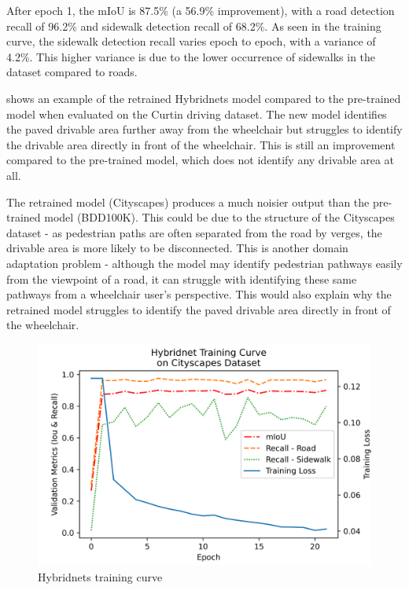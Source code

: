 After epoch 1, the mIoU is 87.5\% (a 56.9\% improvement), with a
road detection recall of 96.2\% and sidewalk detection recall of
68.2\%. As seen in the training curve, the sidewalk detection recall
varies epoch to epoch, with a variance of 4.2\%. This higher variance is
due to the lower occurrence of sidewalks in the dataset compared to roads.

 shows an example of the retrained Hybridnets model
compared to the pre-trained model when evaluated on the Curtin driving dataset.
The new model identifies the paved drivable area further away from
the wheelchair but struggles to identify the drivable area directly in front of the wheelchair.
This is still an improvement compared to the pre-trained model, which does not identify any drivable
area at all.

The retrained model (Cityscapes) produces a much noisier output than the pre-trained model (BDD100K).
This could be due to the structure of the Cityscapes dataset - as pedestrian paths are often
separated from the road by verges, the drivable area is more likely to be disconnected.
This is another domain adaptation problem - although the model may identify pedestrian
pathways easily from the viewpoint of a road, it can struggle with identifying these
same pathways from a wheelchair user's perspective. This would also explain why the
retrained model struggles to identify the paved drivable area directly in front of the wheelchair.

\begin{figure}[b]
    \centering
    \includegraphics[width=0.75\linewidth]{images/hybridnet_training_curve.png}
    \caption{Hybridnets training curve}
    \label{fig:hybridnet_training_curve}
\end{figure}

